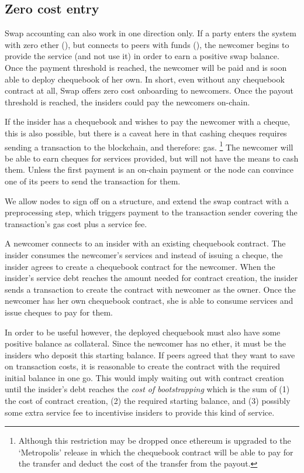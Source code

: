 \subsection{Zero cost entry}

Swap accounting can also work in one direction only. If a party enters the system with zero ether (), but connects to peers with funds (), the newcomer begins to provide the service (and not use it) in order to earn a positive swap balance. Once the payment threshold is reached, the newcomer will be paid and is soon able to deploy chequebook of her own.
In short, even without any chequebook contract at all, Swap offers zero cost onboarding to newcomers. Once the payout threshold is reached, the insiders could pay the newcomers on-chain. 

If the insider has a chequebook and wishes to pay the newcomer with a cheque, this is also possible, but there is a caveat here in that cashing cheques requires sending a transaction to the blockchain, and therefore: gas.%
%
\footnote{Although this restriction may be dropped once ethereum is upgraded to the `Metropolis' release in which the chequebook contract will be able to pay for the transfer and deduct the cost of the transfer from the payout.}
%
The newcomer will be able to earn cheques for services provided, but will not have the means to cash them. 
Unless the first payment is an on-chain payment or the node can convince one of its peers to send the transaction for them.


We allow nodes to sign off on a structure, and extend the swap contract with a preprocessing step, which triggers payment to the transaction sender covering the transaction's gas cost plus a service fee.

  
  
A newcomer connects to  an insider with an existing chequebook contract. The insider consumes the newcomer's services and instead of issuing a cheque, the insider agrees to create a chequebook contract for the newcomer. When the insider's service debt reaches the amount needed for contract creation, the insider sends a transaction to create the contract with newcomer as the owner. Once the newcomer has her own chequebook contract, she is able to consume services and issue cheques to pay for them.
 
In order to be useful however, the deployed chequebook must also have some positive balance as collateral. Since the newcomer has no ether, it must be the insiders who deposit this starting balance. If peers agreed that they want to save on transaction costs, it is reasonable to create the contract with the required initial balance in one go. This would imply waiting out with contract creation until the insider's debt reaches the \emph{cost of bootstrapping} which is the sum of (1) the cost of contract creation, (2) the required starting balance, and (3) possibly some extra service fee to incentivise insiders to provide this kind of service.


